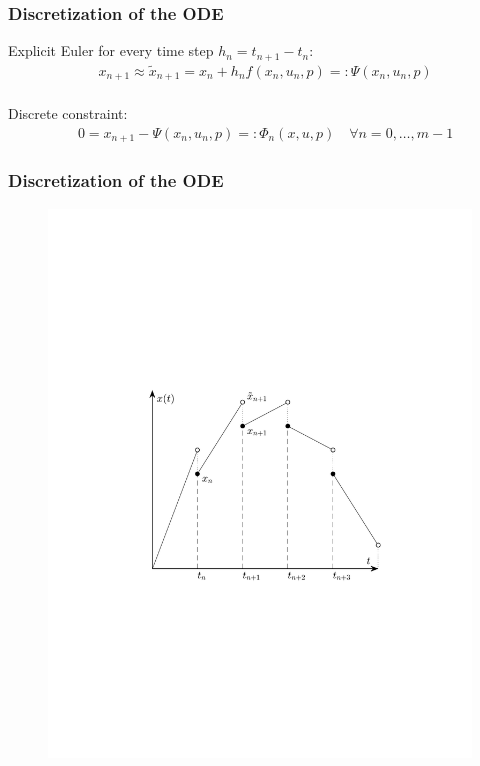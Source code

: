 \begin{frame}
	
	\frametitle{Discretization of the ODE}
	
	Explicit Euler for every time step $h_n=t_{n+1}-t_n$:
	\begin{align*}
        &x_{n+1} \approx \tilde{x}_{n+1} = x_n + h_n f(x_n,u_n,p) =: \Psi(x_n,u_n,p) \\
	\end{align*}
	
	Discrete constraint:
	\begin{align*}
        &0 = x_{n+1} - \Psi(x_n,u_n,p) =: \Phi_n(x,u,p) \quad \forall n = 0,\ldots,m-1
	\end{align*}

	
\end{frame}

\begin{frame}
	\frametitle{Discretization of the ODE}
	
	\begin{figure}[bth]
	  \begin{center}
	    \includegraphics[trim=1cm 5cm 0cm 8cm, clip=true, 
	    width=\linewidth]{img/multShootPlot}
	  \end{center}
	\end{figure}
\end{frame}

